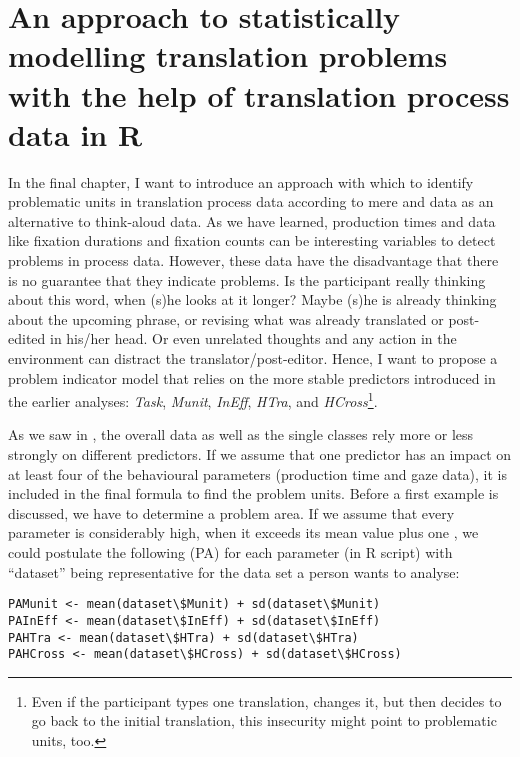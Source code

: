\chapter{An approach to statistically modelling translation problems with the help of translation process data in R}
\label{sec:12}

In the final chapter, I want to introduce an approach with which to identify problematic units in translation process data according to mere  and  data as an alternative to think-aloud data. As we have learned, production times and  data like fixation durations and fixation counts can be interesting variables to detect problems in process data. However, these data have the disadvantage that there is no guarantee that they indicate problems. Is the participant really thinking about this word, when (s)he looks at it longer? Maybe (s)he is already thinking about the upcoming phrase, or revising what was already translated or post-edited in his\slash her head. Or even unrelated thoughts and any action in the environment can distract the translator\slash post-editor. Hence, I want to propose a problem indicator model that relies on the more stable predictors introduced in the earlier analyses: \textit{Task}, \textit{Munit}, \textit{InEff}, \textit{HTra}, and \textit{HCross}\footnote{Even if the participant types one translation, changes it, but then decides to go back to the initial translation, this insecurity might point to problematic units, too.}.



As we saw in , the overall data as well as the single  classes rely more or less strongly on different predictors. If we assume that one predictor has an impact on at least four of the behavioural parameters (production time and gaze data), it is included in the final formula to find the problem units. Before a first example is discussed, we have to determine a problem area. If we assume that every parameter is considerably high, when it exceeds its mean value plus one , we could postulate the following  (PA) for each parameter (in R script) with “dataset” being representative for the data set a person wants to analyse:


\ea
\begin{lstlisting}
PAMunit <- mean(dataset\$Munit) + sd(dataset\$Munit)
PAInEff <- mean(dataset\$InEff) + sd(dataset\$InEff)
PAHTra <- mean(dataset\$HTra) + sd(dataset\$HTra)
PAHCross <- mean(dataset\$HCross) + sd(dataset\$HCross)
\end{lstlisting}
\z


